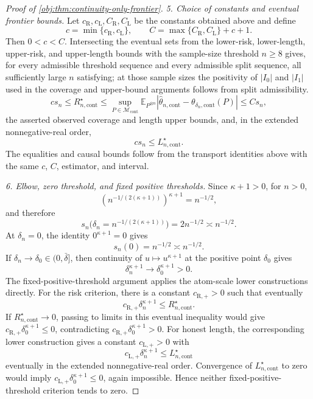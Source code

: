 \documentclass[11pt]{article}
\begin{document}
\begin{proof}[Proof of \cref{obj:thm:continuity-only-frontier}]
\emph{5. Choice of constants and eventual frontier bounds.}
Let \(c_{\mathrm R},c_{\mathrm L},C_{\mathrm R},C_{\mathrm L}\) be the constants obtained above and define
\[
c=\min\{c_{\mathrm R},c_{\mathrm L}\},
\qquad
C=\max\{C_{\mathrm R},C_{\mathrm L}\}+c+1 .
\]
Then \(0<c<C\).  Intersecting the eventual sets from the lower-risk, lower-length, upper-risk, and upper-length bounds with the sample-size threshold \(n\geq8\) gives, for every admissible threshold sequence and every admissible split sequence, all sufficiently large \(n\) satisfying; at those sample sizes the positivity of \(|I_0|\) and \(|I_1|\) used in the coverage and upper-bound arguments follows from split admissibility.
\[
c s_n\leq R_{n,\mathrm{cont}}^\star
\leq
\sup_{P\in\mathcal M_{\mathrm{cont}}}
\mathbb E_{P^{\otimes n}}
\left|\widehat\theta_{n,\mathrm{cont}}-\theta_{\delta_n,\mathrm{cont}}(P)\right|
\leq C s_n,
\]
the asserted observed coverage and length upper bounds, and, in the extended nonnegative-real order,
\[
c s_n\leq L_{n,\mathrm{cont}}^\star.
\]
The equalities and causal bounds follow from the transport identities above with the same \(c\), \(C\), estimator, and interval.

\emph{6. Elbow, zero threshold, and fixed positive thresholds.}
Since \(\kappa+1>0\), for \(n>0\),
\[
\left(n^{-1/(2(\kappa+1))}\right)^{\kappa+1}=n^{-1/2},
\]
and therefore
\[
s_n\bigl(\delta_n=n^{-1/(2(\kappa+1))}\bigr)=2n^{-1/2}\asymp n^{-1/2}.
\]
At \(\delta_n=0\), the identity \(0^{\kappa+1}=0\) gives
\[
s_n(0)=n^{-1/2}\asymp n^{-1/2}.
\]
If \(\delta_n\to\delta_0\in(0,\bar\delta]\), then continuity of \(u\mapsto u^{\kappa+1}\) at the positive point \(\delta_0\) gives
\[
\delta_n^{\kappa+1}\to\delta_0^{\kappa+1}>0 .
\]
The fixed-positive-threshold argument applies the atom-scale lower constructions directly.  For the risk criterion, there is a constant \(c_{\mathrm R,+}>0\) such that eventually
\[
c_{\mathrm R,+}\delta_n^{\kappa+1}
\leq R_{n,\mathrm{cont}}^\star .
\]
If \(R_{n,\mathrm{cont}}^\star\to0\), passing to limits in this eventual inequality would give
\(c_{\mathrm R,+}\delta_0^{\kappa+1}\leq0\), contradicting
\(c_{\mathrm R,+}\delta_0^{\kappa+1}>0\).  For honest length, the corresponding lower construction gives a constant \(c_{\mathrm L,+}>0\) with
\[
c_{\mathrm L,+}\delta_n^{\kappa+1}
\leq L_{n,\mathrm{cont}}^\star
\]
eventually in the extended nonnegative-real order.  Convergence of \(L_{n,\mathrm{cont}}^\star\) to zero would imply
\(c_{\mathrm L,+}\delta_0^{\kappa+1}\leq0\), again impossible.  Hence neither fixed-positive-threshold criterion tends to zero.
\end{proof}
\end{document}
